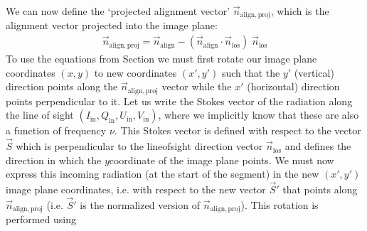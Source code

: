 \documentclass[letterpaper,10pt,english]{sphinxmanual}
\begin{document}
We can now define the ‘projected alignment vector’ \(\vec
n_{\mathrm{align,proj}}\), which is the alignment vector projected into
the image plane:
\begin{equation*}
\begin{split}\vec n_{\mathrm{align,proj}} = \vec n_{\mathrm{align}} - (\vec n_{\mathrm{align}}\cdot
\vec n_{\mathrm{los}})\;\vec n_{\mathrm{los}}\end{split}
\end{equation*}
To use the equations from Section {\hyperref[\detokenize{dustradtrans:sec-basic-equations}]{}} we must first
rotate our image plane coordinates \((x,y)\) to new coordinates \((x',y')\) such
that the \(y'\) (vertical) direction points along the \(\vec
n_{\mathrm{align,proj}}\) vector while the \(x'\) (horizontal) direction points
perpendicular to it. Let us write the Stokes vector of the radiation along
the line of sight
\((I_{\mathrm{in}},Q_{\mathrm{in}},U_{\mathrm{in}},V_{\mathrm{in}})\), where
we implicitly know that these are also a function of frequency \(\nu\). This
Stokes vector is defined with respect to the vector \(\vec S\) which is
perpendicular to the line\sphinxhyphen{}of\sphinxhyphen{}sight direction vector \(\vec n_{\mathrm{los}}\)
and defines the direction in which the \(y\)\sphinxhyphen{}coordinate of the image plane
points. We must now express this incoming radiation (at the start of the
segment) in the new \((x',y')\) image plane coordinates, i.e. with respect to
the new vector \(\vec S'\) that points along \(\vec n_{\mathrm{align,proj}}\)
(i.e. \(\vec S'\) is the normalized version of \(\vec
n_{\mathrm{align,proj}}\)). This rotation is performed using
\end{document}
